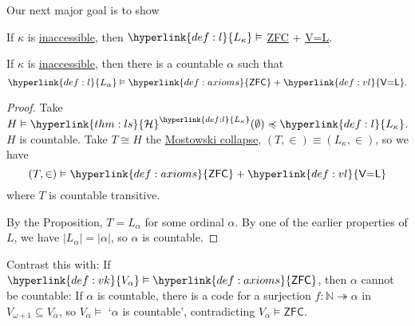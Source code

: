 \documentclass{article}
\newcommand{\1}{\mathbbm{1}}
\let\models\vDash
\begin{document}
Our next major goal is to show
\begin{thm}[G\"odel 1938]
If $\kappa$ is \hyperlink{def:inacc}{inaccessible}, then $\hyperlink{def:l}{L_\kappa} \models$ \hyperlink{def:axioms}{\textsf{ZFC}} + \hyperlink{def:vl}{\textsf{V=L}}.
\end{thm}
\begin{cor}
  If $\kappa$ is \hyperlink{def:inacc}{inaccessible}, then there is a countable $\alpha$ such that
  \begin{equation*}
    \hyperlink{def:l}{L_\alpha} \models \hyperlink{def:axioms}{\textsf{ZFC}} + \hyperlink{def:vl}{\textsf{V=L}}.
  \end{equation*}
\end{cor}
\begin{proof}
  Take $H \models \hyperlink{thm:ls}{\mathcal{H}}^{\hyperlink{def:l}{L_\kappa}}(\emptyset) \preccurlyeq \hyperlink{def:l}{L_\kappa}$. $H$ is countable.
  Take $T \cong H$ the \hyperlink{thm:mct}{Mostowski collapse}, $(T,\in) \equiv (L_\kappa, \in)$, so we have
  \begin{equation*}
    (T,\in) \models \hyperlink{def:axioms}{\textsf{ZFC}}+\hyperlink{def:vl}{\textsf{V=L}}
  \end{equation*}
  where $T$ is countable transitive.

  By the Proposition, $T=L_\alpha$ for some ordinal $\alpha$.
  By one of the earlier properties of $L$, we have $|L_\alpha| = |\alpha|$, so $\alpha$ is countable.
\end{proof}

Contrast this with: If $\hyperlink{def:vk}{V_\alpha} \models \hyperlink{def:axioms}{\textsf{ZFC}}$, then $\alpha$ cannot be countable:
If $\alpha$ is countable, there is a code for a surjection $f: \mathbb{N} \twoheadrightarrow \alpha$ in $V_{\omega+1} \subseteq V_\alpha$, so $V_\alpha \models $ `$\alpha$ is countable', contradicting $V_\alpha \models \textsf{ZFC}$.
\end{document}
